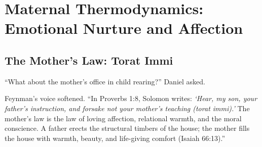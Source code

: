 \documentclass[11pt]{report}
\begin{document}
\chapter{Maternal Thermodynamics: Emotional Nurture and Affection}

\section{The Mother's Law: Torat Immi}
``What about the mother's office in child rearing?'' Daniel asked.

Feynman's voice softened. ``In Proverbs 1:8, Solomon writes: \textit{`Hear, my son, your father's instruction, and forsake not your mother's teaching (torat immi).'} The mother's law is the law of loving affection, relational warmth, and the moral conscience. A father erects the structural timbers of the house; the mother fills the house with warmth, beauty, and life-giving comfort (Isaiah 66:13).''
\end{document}
